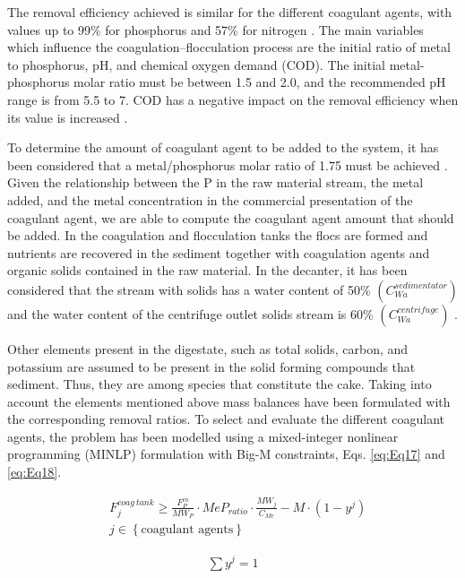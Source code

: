 \begin{refsection}[referencesCh2]
The removal efficiency achieved is similar for the different coagulant agents, with values up to 99\% for phosphorus and 57\% for nitrogen \citep{aguilar2002nutrient}. The main variables which inﬂuence the coagulation–ﬂocculation process are the initial ratio of metal to phosphorus, pH, and chemical oxygen demand (COD). The initial metal-phosphorus molar ratio must be between 1.5 and 2.0, and the recommended pH range is from 5.5 to 7. COD has a negative impact on the removal efficiency when its value is increased \citep{szabo2008significance}.

To determine the amount of coagulant agent to be added to the system, it has been considered that a metal/phosphorus molar ratio of 1.75 must be achieved \citep{szabo2008significance}. Given the relationship between the P in the raw material stream, the metal added, and the metal concentration in the commercial presentation of the coagulant agent, we are able to compute the coagulant agent amount that should be added. In the coagulation and flocculation tanks the flocs are formed and nutrients are recovered in the sediment together with coagulation agents and organic solids contained in the raw material. In the decanter, it has been considered that the stream with solids has a water content of 50\% $\left(C^{sedimentator}_{Wa}\right)$ \citep{williams2011digestates} and the water content of the centrifuge outlet solids stream is 60\% $\left(C^{centrifuge}_{Wa}\right)$ \citep{wakeman2007separation}.

Other elements present in the digestate, such as total solids, carbon, and potassium are assumed to be present in the solid forming compounds that sediment. Thus, they are among species that constitute the cake. Taking into account the elements mentioned above mass balances have been formulated with the corresponding removal ratios. To select and evaluate the different coagulant agents, the problem has been modelled using a mixed-integer nonlinear programming (MINLP) formulation with Big-M constraints, Eqs. \ref{eq:Eq17} and \ref{eq:Eq18}.

\begin{align}
	& F_j^{{{coag \ tank}}} \ge \frac{F_P^{in}}{MW_P} \cdot MeP_{ratio} \cdot \frac{MW_j}{C_{Me}} - M \cdot \left(1 - {y^j}\right) \label{eq:Eq17} \\
	& {j} \in \left\{ \text{coagulant agents} \right\} \nonumber
\end{align}

\begin{align}
	\sum {{{{y}}^j}} = 1 \label{eq:Eq18}
\end{align}


\end{refsection}
